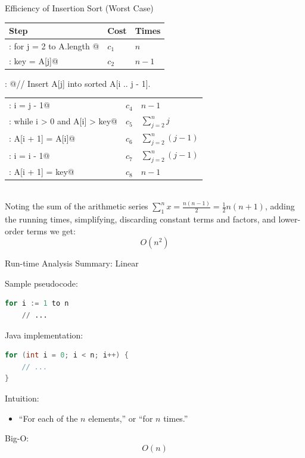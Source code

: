 \documentclass{beamer}
\begin{document}
\begin{frame}[fragile]{Efficiency of Insertion Sort (Worst Case)}


\begin{tabular}{lll}
Step                                   & Cost  & Times \\\hline
\verb@1: for j = 2 to A.length         @  & $c_1$ & $n$ \\
\verb@2:     key = A[j]@                  & $c_2$ & $n - 1$  \\
\end{tabular}
:     @// Insert A[j] into sorted A[i .. j - 1].\\
\begin{tabular}{lll}
\verb@4:     i = j - 1@                   & $c_4$ & $n - 1$  \\
\verb@5:     while i > 0 and A[i] > key@  & $c_5$ & $\sum_{j=2}^n j$  \\
\verb@6:         A[i + 1] = A[i]@         & $c_6$ & $\sum_{j=2}^n (j - 1)$  \\
\verb@7:         i = i - 1@               & $c_7$ & $\sum_{j=2}^n (j - 1)$  \\
\verb@8:    A[i + 1] = key@               & $c_8$ & $n - 1$  \\
\end{tabular}
\\
\vspace{.1in}
Noting the sum of the arithmetic series $\sum_1^n x = \frac{n(n-1)}{2} = \frac{1}{2}n(n+1)$, adding the running times, simplifying, discarding constant terms and factors, and lower-order terms we get:
\[
O(n^2)
\]


\end{frame}


\begin{frame}[fragile]{Run-time Analysis Summary: Linear}

Sample pseudocode:
\begin{lstlisting}[language=Python]
for i := 1 to n
    // ...
\end{lstlisting}
Java implementation:
\begin{lstlisting}[language=Java]
for (int i = 0; i < n; i++) {
    // ...
}
\end{lstlisting}
Intuition:
\begin{itemize}
\item ``For each of the $n$ elements,'' or ``for $n$ times.''
\end{itemize}
Big-O:
\[
O(n)
\]

\end{frame}
\end{document}
